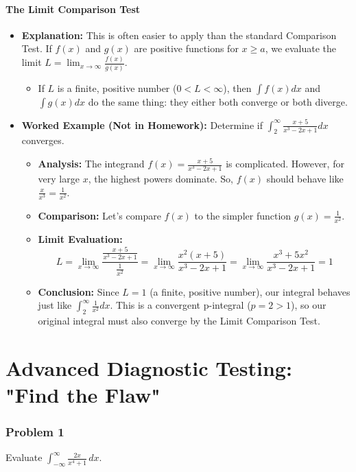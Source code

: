 \documentclass{article}
\begin{document}
\subsection{The Limit Comparison Test}
\begin{itemize}
    \item \textbf{Explanation:} This is often easier to apply than the standard Comparison Test. If $f(x)$ and $g(x)$ are positive functions for $x \ge a$, we evaluate the limit $L = \lim_{x \to \infty} \frac{f(x)}{g(x)}$.
    \begin{itemize}
        \item If $L$ is a finite, positive number ($0 < L < \infty$), then $\int f(x) dx$ and $\int g(x) dx$ do the same thing: they either both converge or both diverge.
    \end{itemize}
    \item \textbf{Worked Example (Not in Homework):} Determine if $\int_2^\infty \frac{x+5}{x^3 - 2x + 1} dx$ converges.
    \begin{itemize}
        \item \textbf{Analysis:} The integrand $f(x) = \frac{x+5}{x^3 - 2x + 1}$ is complicated. However, for very large $x$, the highest powers dominate. So, $f(x)$ should behave like $\frac{x}{x^3} = \frac{1}{x^2}$.
        \item \textbf{Comparison:} Let's compare $f(x)$ to the simpler function $g(x) = \frac{1}{x^2}$.
        \item \textbf{Limit Evaluation:}
        \[ L = \lim_{x \to \infty} \frac{\frac{x+5}{x^3 - 2x + 1}}{\frac{1}{x^2}} = \lim_{x \to \infty} \frac{x^2(x+5)}{x^3 - 2x + 1} = \lim_{x \to \infty} \frac{x^3+5x^2}{x^3 - 2x + 1} = 1 \]
        \item \textbf{Conclusion:} Since $L=1$ (a finite, positive number), our integral behaves just like $\int_2^\infty \frac{1}{x^2} dx$. This is a convergent p-integral ($p=2>1$), so our original integral must also converge by the Limit Comparison Test.
    \end{itemize}
\end{itemize}


\part{Advanced Diagnostic Testing: "Find the Flaw"}

\section{Problem 1}
Evaluate $\displaystyle \int_{-\infty}^{\infty} \frac{2x}{x^4 + 1} \,dx$.
\end{document}
